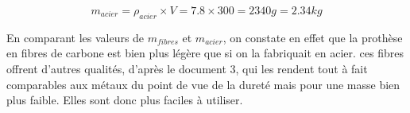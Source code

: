 \documentclass[a4paper,12pt]{exam}
\begin{document}
\begin{questions}
\begin{parts}
\begin{solution}
				\begin{equation*}
				m_{acier} = \rho_{acier} \times V = \num{7.8} \times 300 = \num{2340} g = \num{2.34} kg
				\end{equation*}
				
				
				En comparant les valeurs de $m_{fibres}$ et $m_{acier}$, on constate en effet que la prothèse en fibres de carbone est bien plus légère que si on la fabriquait en acier. ces fibres offrent d'autres qualités, d'après le document 3, qui les rendent tout à fait comparables aux métaux du point de vue de la dureté mais pour une masse bien plus faible. Elles sont donc plus faciles à utiliser.
			\end{solution}
		\end{parts}	
			
\end{questions}

%
%
%

%






 
%
\ \label{LastPage}
\end{document}
